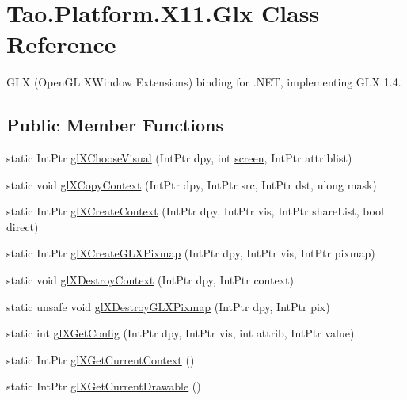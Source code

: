 \hypertarget{class_tao_1_1_platform_1_1_x11_1_1_glx}{
\section{Tao.Platform.X11.Glx Class Reference}
\label{class_tao_1_1_platform_1_1_x11_1_1_glx}
}


GLX (OpenGL XWindow Extensions) binding for .NET, implementing GLX 1.4.  


\subsection*{Public Member Functions}
\begin{DoxyCompactItemize}
\item 
static IntPtr \hyperlink{class_tao_1_1_platform_1_1_x11_1_1_glx_a866efd6595cec1d6127d9bdd891f57b4}{glXChooseVisual} (IntPtr dpy, int \hyperlink{_sdl_8cs_a968bba55c7ad32b326939fefd1bbb017}{screen}, IntPtr attriblist)
\item 
static void \hyperlink{class_tao_1_1_platform_1_1_x11_1_1_glx_a40c1d19d7e8b05a560ab41f148ecf928}{glXCopyContext} (IntPtr dpy, IntPtr src, IntPtr dst, ulong mask)
\item 
static IntPtr \hyperlink{class_tao_1_1_platform_1_1_x11_1_1_glx_aa057757b63daa01aeb450d2c3d1458dd}{glXCreateContext} (IntPtr dpy, IntPtr vis, IntPtr shareList, bool direct)
\item 
static IntPtr \hyperlink{class_tao_1_1_platform_1_1_x11_1_1_glx_a8dc0806e8e855c024c2193b85e5869da}{glXCreateGLXPixmap} (IntPtr dpy, IntPtr vis, IntPtr pixmap)
\item 
static void \hyperlink{class_tao_1_1_platform_1_1_x11_1_1_glx_a9ca23bfc04afdc00940e5c33cb003b54}{glXDestroyContext} (IntPtr dpy, IntPtr context)
\item 
static unsafe void \hyperlink{class_tao_1_1_platform_1_1_x11_1_1_glx_ae82176a8a1995e2829dab558a476dfcb}{glXDestroyGLXPixmap} (IntPtr dpy, IntPtr pix)
\item 
static int \hyperlink{class_tao_1_1_platform_1_1_x11_1_1_glx_a209064099f2f4816ca3ef36c17fd728a}{glXGetConfig} (IntPtr dpy, IntPtr vis, int attrib, IntPtr value)
\item 
static IntPtr \hyperlink{class_tao_1_1_platform_1_1_x11_1_1_glx_aa499032eba5073b40cec5af8655bd2d1}{glXGetCurrentContext} ()
\item 
static IntPtr \hyperlink{class_tao_1_1_platform_1_1_x11_1_1_glx_a36dfb26a77ebbcf9c3245ef28320e48a}{glXGetCurrentDrawable} ()

\end{DoxyCompactItemize}
